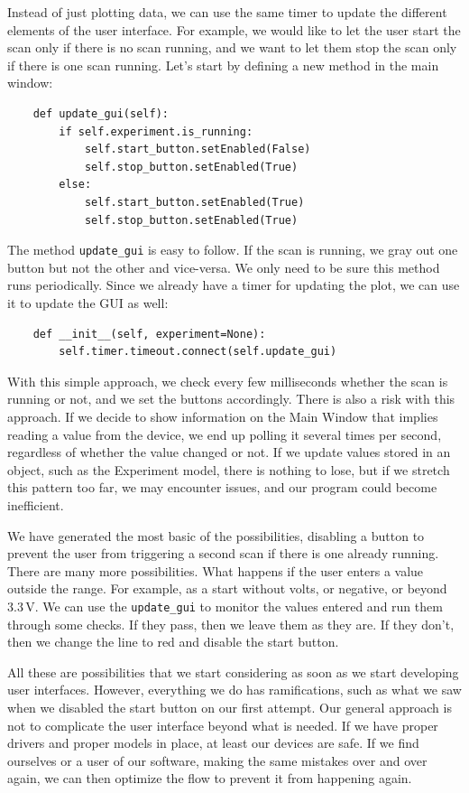 Instead of just plotting data, we can use the same timer to update the different elements of the user interface. For example, we would like to let the user start the scan only if there is no scan running, and we want to let them stop the scan only if there is one scan running. Let's start by defining a new method in the main window:

\begin{verbatim}
    def update_gui(self):
        if self.experiment.is_running:
            self.start_button.setEnabled(False)
            self.stop_button.setEnabled(True)
        else:
            self.start_button.setEnabled(True)
            self.stop_button.setEnabled(True)
\end{verbatim}

The method \texttt{update\_gui} is easy to follow. If the scan is running, we gray out one button but not the other and vice-versa. We only need to be sure this method runs periodically. Since we already have a timer for updating the plot, we can use it to update the GUI as well:

\begin{verbatim}
    def __init__(self, experiment=None):
        self.timer.timeout.connect(self.update_gui)
\end{verbatim}

With this simple approach, we check every few milliseconds whether the scan is running or not, and we set the buttons accordingly. There is also a risk with this approach. If we decide to show information on the Main Window that implies reading a value from the device, we end up polling it several times per second, regardless of whether the value changed or not. If we update values stored in an object, such as the Experiment model, there is nothing to lose, but if we stretch this pattern too far, we may encounter issues, and our program could become inefficient.

We have generated the most basic of the possibilities, disabling a button to prevent the user from triggering a second scan if there is one already running. There are many more possibilities. What happens if the user enters a value outside the range. For example, as a start without volts, or negative, or beyond $3.3\,\textrm{V}$. We can use the \texttt{update\_gui} to monitor the values entered and run them through some checks. If they pass, then we leave them as they are. If they don't, then we change the line to red and disable the start button.

All these are possibilities that we start considering as soon as we start developing user interfaces. However, everything we do has ramifications, such as what we saw when we disabled the start button on our first attempt. Our general approach is not to complicate the user interface beyond what is needed. If we have proper drivers and proper models in place, at least our devices are safe. If we find ourselves or a user of our software, making the same mistakes over and over again, we can then optimize the flow to prevent it from happening again.

